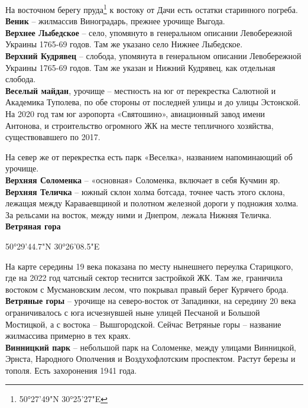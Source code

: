 На восточном берегу пруда\footnote{50°27'49"N 30°25'27"E} к востоку от Дачи есть остатки старинного погреба.\\  


\textbf{Веник} – жилмассив Виноградарь, прежнее урочище Выгода.\\

\textbf{Верхнее Лыбедское} – село, упомянуто в генеральном описании Левобережной Украины 1765-69 годов. Там же указано село Нижнее Лыбедское.\\

\textbf{Верхний Кудрявец} – слобода, упомянута в генеральном описании Левобережной Украины 1765-69 годов. Там же указан и Нижний Кудрявец, как отдельная слобода.\\

\textbf{Веселый майдан}, урочище – местность на юг от перекрестка Салютной и Академика Туполева, по обе стороны от последней улицы и до улицы Эстонской. На 2020 год там юг аэропорта «Святошино», авиационный завод имени Антонова, и строительство огромного ЖК на месте тепличного хозяйства, существовавшего по 2017. 

На север же от перекрестка есть парк «Веселка», названием напоминающий об урочище.\\

\textbf{Верхняя Соломенка} – «основная» Соломенка, включает в себя Кучмин яр.\\

\textbf{Верхняя Теличка} – южный склон холма ботсада, точнее часть этого склона, лежащая между Караваевщиной и полотном железной дороги у подножия холма. За рельсами на восток, между ними и Днепром, лежала Нижняя Теличка.\\

\textbf{Ветряная гора}

50°29'44.7"N 30°26'08.5"E

На карте середины 19 века показана по месту нынешнего переулка Старицкого, где на 2022 год чатсный сектор теснится застройкой ЖК. Там же, граничила востоком с Мусмановским лесом, что покрывал правый берег Курячего брода.\\

\textbf{Ветряные горы} – урочище на северо-восток от Западинки, на середину 20 века ограничивалось с юга исчезнувшей ныне улицей Песчаной и Большой Мостицкой, а с востока – Вышгородской. Сейчас Ветряные горы – название жилмассива примерно в тех краях.\\

\textbf{Винницкий парк} – небольшой парк на Соломенке, между улицами Винницкой, Эрнста, Народного Ополчения и Воздухофлотским проспектом. Растут березы и тополя. Есть захоронения 1941 года.\\

